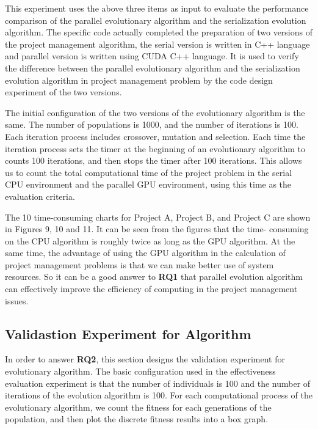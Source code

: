 
This experiment uses the above three items as input to evaluate the 
performance comparison of the parallel evolutionary algorithm and the 
serialization evolution algorithm. The specific code actually completed the 
preparation of two versions of the project management algorithm, the serial 
version is written in C++ language and parallel version is written using CUDA
C++ language. It is used to verify the difference between the parallel 
evolutionary algorithm and the serialization evolution algorithm in project 
management problem by the code design experiment of the two versions.


The initial configuration of the two versions of the evolutionary algorithm 
is the same. The number of populations is 1000, and the number of iterations 
is 100. Each iteration process includes crossover, mutation and selection. 
Each time the iteration process sets the timer at the beginning of an 
evolutionary algorithm to counts 100 iterations, and then stops the timer 
after 100 iterations. This allows us to count the total computational time of 
the project problem in the serial CPU environment and the parallel GPU 
environment, using this time as the evaluation criteria.


The 10 time-consuming charts for Project A, Project B, and Project C are 
shown in Figures 9, 10 and 11. It can be seen from the figures that the time-
consuming on the CPU algorithm is roughly twice as long as the GPU algorithm. 
At the same time, the advantage of using the GPU algorithm in the calculation 
of project management problems is that we can make better use of system 
resources. So it can be a good answer to \textbf{RQ1} that parallel evolution 
algorithm can effectively improve the efficiency of computing in the project 
management issues.

\subsection{Validastion Experiment for Algorithm}
%
In order to answer \textbf{RQ2}, this section designs the validation experiment for 
evolutionary algorithm. The basic configuration used in the effectiveness 
evaluation experiment is that the number of individuals is 100 and the number 
of iterations of the evolution algorithm is 100. For each computational 
process of the evolutionary algorithm, we count the fitness for each 
generations of the population, and then plot the discrete fitness results 
into a box graph.


